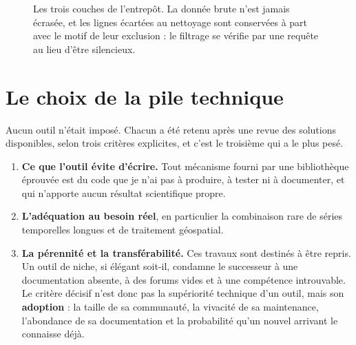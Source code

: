 \begin{figure}[H]
\caption{Les trois couches de l'entrepôt. La donnée brute n'est jamais écrasée, et les lignes
écartées au nettoyage sont conservées à part avec le motif de leur exclusion : le filtrage se
vérifie par une requête au lieu d'être silencieux.}
\label{fig:medaillon}
\end{figure}

\section{Le choix de la pile technique}

Aucun outil n'était imposé. Chacun a été retenu après une revue des solutions disponibles, selon
trois critères explicites, et c'est le troisième qui a le plus pesé.

\begin{enumerate}
  \item \textbf{Ce que l'outil évite d'écrire.} Tout mécanisme fourni par une bibliothèque
  éprouvée est du code que je n'ai pas à produire, à tester ni à documenter, et qui n'apporte
  aucun résultat scientifique propre.
  \item \textbf{L'adéquation au besoin réel}, en particulier la combinaison rare de séries
  temporelles longues et de traitement géospatial.
  \item \textbf{La pérennité et la transférabilité.} Ces travaux sont destinés à être repris.
  Un outil de niche, si élégant soit-il, condamne le successeur à une documentation absente, à
  des forums vides et à une compétence introuvable. Le critère décisif n'est donc pas la
  supériorité technique d'un outil, mais son \textbf{adoption} : la taille de sa communauté, la
  vivacité de sa maintenance, l'abondance de sa documentation et la probabilité qu'un nouvel
  arrivant le connaisse déjà.
\end{enumerate}


